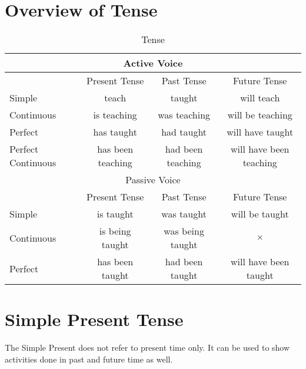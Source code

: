 \section{Overview of Tense}
\begin{table}
    \centering
    \begin{tabular}{|l|c|c|c|}
        \hline
        \multicolumn{4}{|c|}{Active Voice} \\ \hline
        & Present Tense & Past Tense & Future Tense \\ \hline
        Simple & teach & taught & will teach \\ \hline
        Continuous & is teaching & was teaching & will be teaching \\ \hline
        Perfect & has taught & had taught & will have taught \\ \hline
        Perfect Continuous & has been teaching & had been teaching & will have been teaching \\ \hline \hline
        \multicolumn{4}{|c|}{Passive Voice} \\ \hline
        & Present Tense & Past Tense & Future Tense \\ \hline
        Simple & is taught & was taught & will be taught \\ \hline
        Continuous & is being taught & was being taught & $\times$ \\ \hline
        Perfect & has been taught & had been taught & will have been taught \\ \hline
    \end{tabular}
    \caption{Tense}
\end{table}

\newpage
\section{Simple Present Tense}
The Simple Present does not refer to present time only.
It can be used to show activities done in past and future time as well.

